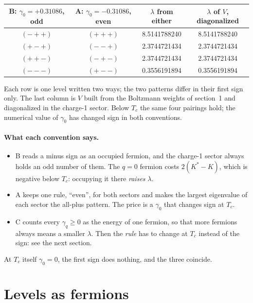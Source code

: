 \documentclass[11pt]{article}
\begin{document}
\begin{center}\begin{tabular}{cccc}
\toprule
B: $\gamma_0 = +0.31086$, odd & A: $\gamma_0 = -0.31086$, even & $\lambda$ from either & $\lambda$ of $V$, diagonalized \\
\midrule
$(-++)$ & $(+++)$ & 8.5141788240 & 8.5141788240 \\
$(+-+)$ & $(--+)$ & 2.3744721434 & 2.3744721434 \\
$(++-)$ & $(-+-)$ & 2.3744721434 & 2.3744721434 \\
$(---)$ & $(+--)$ & 0.3556191894 & 0.3556191894 \\
\bottomrule
\end{tabular}\end{center}

Each row is one level written two ways; the two patterns differ in their first sign only.  The
last column is $V$ built from the Boltzmann weights of section~1 and diagonalized in the charge-1
sector.  Below $T_c$ the same four pairings hold; the numerical value of $\gamma_0$ has changed
sign in both conventions.

\paragraph{What each convention says.}
\begin{itemize}
\item B reads a minus sign as an occupied fermion, and the charge-1 sector always holds an odd
  number of them.  The $q = 0$ fermion costs $2(K^* - K)$, which is negative below $T_c$:
  occupying it there \emph{raises} $\lambda$.
\item A keeps one rule, ``even'', for both sectors and makes the largest eigenvalue of each
  sector the all-plus pattern.  The price is a $\gamma_0$ that changes sign at $T_c$.
\item C counts every $\gamma_q \ge 0$ as the energy of one fermion, so that more fermions always
  means a smaller $\lambda$.  Then the \emph{rule} has to change at $T_c$ instead of the sign: see
  the next section.
\end{itemize}
At $T_c$ itself $\gamma_0 = 0$, the first sign does nothing, and the three coincide.

\section{Levels as fermions}
\end{document}
